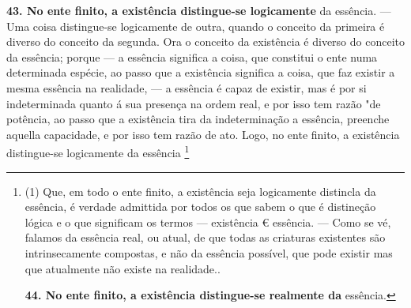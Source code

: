 \documentclass[12pt,a4paper]{article}
\newcommand{\pagmark}[1]{\quad[\textit{p.\,#1}]\quad}
\begin{document}
{{{{{{{{{{{{{\pagmark{315}

\medskip\noindent\textbf{43. No ente finito, a existência distingue-se logicamente}
da essência. — Uma coisa distingue-se logicamente de outra,
quando o conceito da primeira é diverso do conceito da segunda.
Ora o conceito da existência é diverso do conceito da essência;
porque — a essência significa a coisa, que constitui o ente numa
determinada espécie, ao passo que a existência significa a coisa,
que faz existir a mesma essência na realidade, — a essência é
capaz de existir, mas é por si indeterminada quanto á sua
presença na ordem real, e por isso tem razão "de potência, ao
passo que a existência tira da indeterminação a essência, preenche aquella capacidade, e por isso tem razão de ato. Logo, no
ente finito, a existência distingue-se logicamente da essência \footnote{(1) Que, em todo o ente finito, a existência seja logicamente distincla
da essência, é verdade admittida por todos os que sabem o que é distineção
lógica e o que significam os termos — existência € essência. — Como se vé,
falamos da essência real, ou atual, de que todas as criaturas existentes
são intrinsecamente compostas, e não da essência possível, que pode existir
mas que atualmente não existe na realidade.. 
\pagmark{315}

\medskip\noindent\textbf{44. No ente finito, a existência distingue-se realmente da}
essência.

}}}}}}}}}}}}}}
\end{document}

